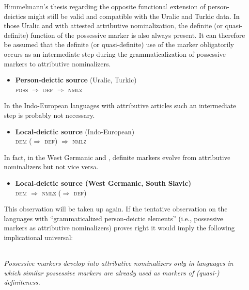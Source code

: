 {Himmelmann's thesis regarding the opposite functional extension of person-deictics might still be valid and compatible with the Uralic and Turkic data. In those Uralic and  with attested attributive nominalization, the definite (or quasi-definite) function of the possessive marker is also always present. It can therefore be assumed that the definite (or quasi-definite) use of the marker obligatorily occurs as an intermediate step during the grammaticalization of possessive markers to attributive nominalizers.
\begin{itemize}
\item \textbf{Person-deictic source} (Uralic, Turkic)\\
	\textsc{poss $\Rightarrow$ def $\Rightarrow$ nmlz}
\end{itemize}

In the Indo-European languages with attributive articles such an intermediate step is probably not necessary.
\begin{itemize}
\item \textbf{Local-deictic source} (Indo-European)\\
	\textsc{dem ($\Rightarrow$ def) $\Rightarrow$ nmlz}
\end{itemize}

In fact, in the West Germanic and , definite markers evolve from attributive nominalizers but not vice versa.
\begin{itemize}
\item \textbf{Local-deictic source (West Germanic, South Slavic)}\\
	\textsc{dem $\Rightarrow$ nmlz ($\Rightarrow$ def)}
\end{itemize}

This observation will be taken up again. If the tentative observation on the languages with “grammaticalized person-deictic elements” (i.e., possessive markers as attributive nominalizers) proves right it would imply the following implicational universal:
\begin{exe}
\label{universal}
\\
	\textit{Possessive markers develop into attributive nominalizers only in languages in which similar possessive markers are already used as markers of (quasi-) definiteness.}
\end{exe}

}

